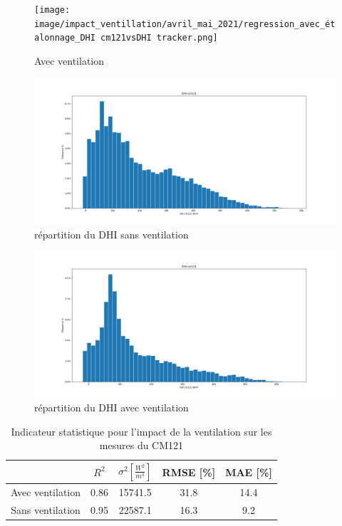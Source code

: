 \documentclass[12pt,a4paper]{article}
\begin{document}
\begin{flushleft}
\begin{figure}[H]
\centering
\texttt{[image: image/impact\_ventillation/avril\_mai\_2021/regression\_avec\_étalonnage\_DHI cm121vsDHI tracker.png]} 
\caption{Avec ventilation}  
\end{figure}



\begin{figure}[H]
\centering
\includegraphics[width=15cm]{image/impact_ventillation/archive_2021-03-11_2021-04-20/histogramme_3.png} 
\caption{répartition du DHI sans ventilation}  
\end{figure}

\begin{figure}[H]
\centering
\includegraphics[width=15cm]{image/impact_ventillation/avril_mai_2021/histogramme_3.png}  
\caption{répartition du DHI avec ventilation}  
\end{figure}




\begin{table}[H]
\begin{center}
\begin{tabular}{ |c|c|c|c|c| } 
 \hline
  & $R^2$ & $\sigma ^2 [\frac{W^2}{m^4}]$ & RMSE [\%] & MAE [\%] \\ 
  \hline
 Avec ventilation & 0.86 & 15741.5 & 31.8 & 14.4\\ 
 \hline
 Sans ventilation & 0.95 & 22587.1 & 16.3 & 9.2 \\ 
 \hline
\end{tabular}
\caption{Indicateur statistique pour l'impact de la ventilation sur les mesures du CM121}
\end{center}
\end{table}



\end{flushleft}
\end{document}
